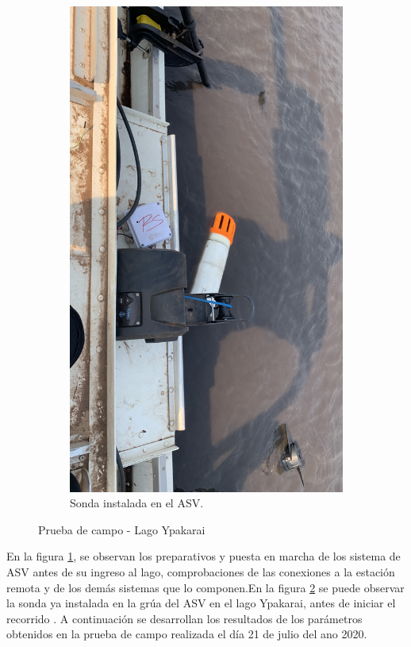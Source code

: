 \begin{figure}[H]
\begin{subfigure}[b]{0.3\textwidth}
         \includegraphics[width=\textwidth]{Imagenes/cap4/PruebaCampo1.JPG}
         \caption{Sonda instalada en el ASV.}
         \label{fig:SondaASV}
     \end{subfigure}
     \hfill
    \caption{Prueba de campo - Lago Ypakarai}
    \label{fig:PruebaCampo}
\end{figure}
En la figura \ref{fig:SondaASV}, se observan los preparativos y puesta en marcha de los sistema de ASV antes de su ingreso al lago, comprobaciones de las conexiones a la estación remota y de los demás sistemas que lo componen.En la figura \ref{fig:PruebaCampo} se puede observar la sonda ya instalada en la gr\'ua del ASV en el lago Ypakarai, antes de iniciar el recorrido . 
A continuación se desarrollan los resultados de los parámetros obtenidos en la prueba de campo realizada el día 21 de julio del ano 2020.

